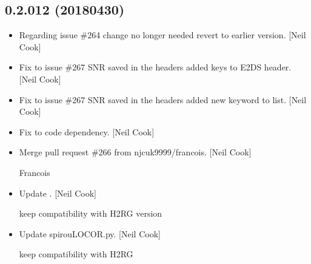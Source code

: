 \documentclass[a4paper,10pt,english]{report}
\begin{document}
\subsection{0.2.012 (2018\sphinxhyphen{}04\sphinxhyphen{}30)}
\label{\detokenize{misc/changelog:id467}}\begin{itemize}
\item {} 
Regarding issue \#264 \sphinxhyphen{} change no longer needed \sphinxhyphen{} revert to earlier
version. {[}Neil Cook{]}

\item {} 
Fix to issue \#267 \sphinxhyphen{} SNR saved in the headers \sphinxhyphen{} added keys to E2DS
header. {[}Neil Cook{]}

\item {} 
Fix to issue \#267 \sphinxhyphen{} SNR saved in the headers \sphinxhyphen{} added new keyword to
list. {[}Neil Cook{]}

\item {} 
Fix to code dependency. {[}Neil Cook{]}

\item {} 
Merge pull request \#266 from njcuk9999/francois. {[}Neil Cook{]}

Francois

\item {} 
Update . {[}Neil Cook{]}

keep compatibility with H2RG version

\item {} 
Update spirouLOCOR.py. {[}Neil Cook{]}

keep compatibility with H2RG

\end{itemize}
\end{document}
